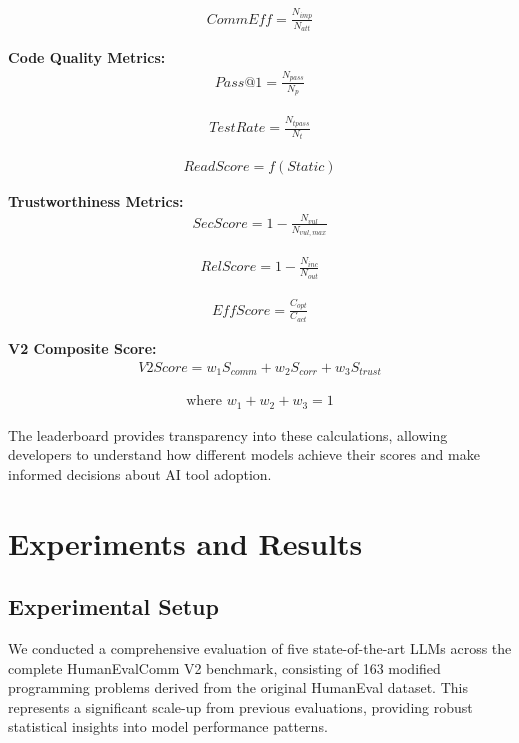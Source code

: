 \documentclass[conference]{IEEEtran}
\begin{document}
\begin{align}
    \mathit{CommEff} = \frac{N_{imp}}{N_{att}}
\end{align}

\textbf{Code Quality Metrics:}
\begin{align}
    \mathit{Pass@1} = \frac{N_{pass}}{N_{p}}
\end{align}

\begin{align}
    \mathit{TestRate} = \frac{N_{tpass}}{N_{t}}
\end{align}

\begin{align}
    \mathit{ReadScore} = f(\mathit{Static})
\end{align}

\textbf{Trustworthiness Metrics:}
\begin{align}
    \mathit{SecScore} = 1 - \frac{N_{vul}}{N_{vul,max}}
\end{align}

\begin{align}
    \mathit{RelScore} = 1 - \frac{N_{inc}}{N_{out}}
\end{align}

\begin{align}
    \mathit{EffScore} = \frac{C_{opt}}{C_{act}}
\end{align}

\textbf{V2 Composite Score:}
\begin{align}
    \mathit{V2Score} = w_1 S_{comm} + w_2 S_{corr} + w_3 S_{trust}
\end{align}

\begin{align}
    \text{where } w_1 + w_2 + w_3 = 1
\end{align}

The leaderboard provides transparency into these calculations, allowing developers to understand how different models achieve their scores and make informed decisions about AI tool adoption.

\section{Experiments and Results}

\subsection{Experimental Setup}

We conducted a comprehensive evaluation of five state-of-the-art LLMs across the complete HumanEvalComm V2 benchmark, consisting of 163 modified programming problems derived from the original HumanEval dataset. This represents a significant scale-up from previous evaluations, providing robust statistical insights into model performance patterns.
\end{document}
